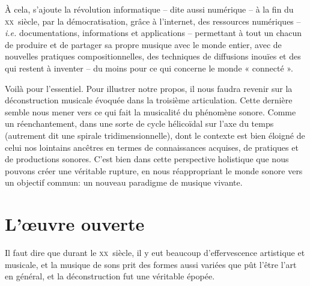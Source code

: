 \documentclass{article}
\begin{document}
À cela, s'ajoute la révolution informatique  -- dite aussi numérique --  à la fin du \textsc{xx}\ieme ~siècle,  par la démocratisation, grâce à l'internet, des ressources numériques -- \textit{i.e.} documentations, informations et applications -- permettant à tout un chacun de produire et de partager sa propre musique avec le monde entier, avec de nouvelles pratiques compositionnelles, des techniques de diffusions inouïes et des qui restent à inventer -- du moins pour ce qui concerne le monde « connecté ».


\bigskip

Voilà pour l'essentiel. Pour illustrer notre propos, il nous faudra revenir sur la déconstruction musicale évoquée dans la troisième articulation. Cette dernière semble nous mener vers ce qui fait la musicalité du phénomène sonore. Comme un réenchantement, dans une sorte de cycle hélicoïdal sur l'axe du temps (autrement dit une spirale tridimensionnelle), dont le contexte est bien éloigné de celui nos lointains ancêtres en termes de connaissances acquises, de pratiques et de productions sonores. C'est bien dans cette perspective holistique que nous pouvons créer une véritable rupture, en nous réappropriant le monde sonore vers un objectif commun: un nouveau paradigme de musique vivante.

\section*{L'œuvre ouverte}
\label{oo}

Il faut dire que durant le \textsc{xx}\ieme ~siècle, il y eut beaucoup d'effervescence artistique et musicale, et la musique de sons prit des formes aussi variées que pût l'être l'art en général, et la déconstruction fut une véritable épopée.
\end{document}
